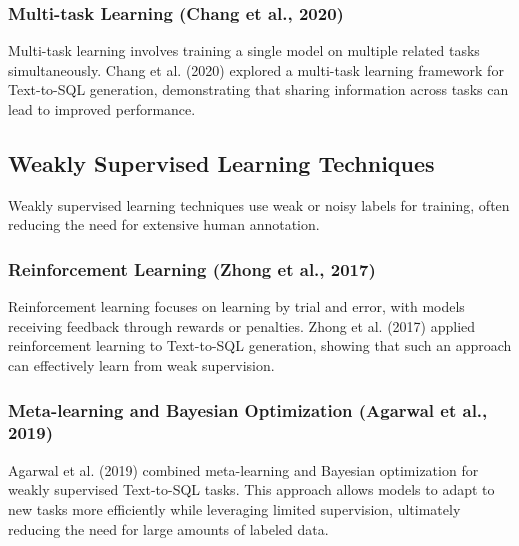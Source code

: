 \subsubsection{Multi-task Learning (Chang et al., 2020)}

Multi-task learning involves training a single model on multiple related tasks simultaneously. Chang et al. (2020) explored a multi-task learning framework for Text-to-SQL generation, demonstrating that sharing information across tasks can lead to improved performance.

\subsection{Weakly Supervised Learning Techniques}

Weakly supervised learning techniques use weak or noisy labels for training, often reducing the need for extensive human annotation.

\subsubsection{Reinforcement Learning (Zhong et al., 2017)}

Reinforcement learning focuses on learning by trial and error, with models receiving feedback through rewards or penalties. Zhong et al. (2017) applied reinforcement learning to Text-to-SQL generation, showing that such an approach can effectively learn from weak supervision.

\subsubsection{Meta-learning and Bayesian Optimization (Agarwal et al., 2019)}

Agarwal et al. (2019) combined meta-learning and Bayesian optimization for weakly supervised Text-to-SQL tasks. This approach allows models to adapt to new tasks more efficiently while leveraging limited supervision, ultimately reducing the need for large amounts of labeled data.
